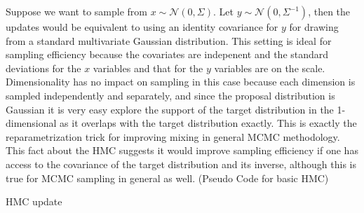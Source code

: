 \documentclass{book}
\begin{document}
\begin{enumerate}
Suppose we want to sample from $x \sim \mathcal{N}(0,\Sigma)$. Let $y \sim
\mathcal{N}(0,\Sigma^{-1})$, then the updates would be equivalent to using an
identity covariance for $y$ for drawing from a standard multivariate Gaussian
distribution. This setting is ideal for sampling efficiency because the
covariates are indepenent and the standard deviations for the $x$ variables and
that for the $y$ variables are on the scale. Dimensionality has no impact on sampling in this case because
each dimension is sampled independently and separately, and since the proposal
distribution is Gaussian it is very easy explore the support of the target
distribution in the 1-dimensional as it overlaps with the target distribution
exactly. 
This is exactly the
reparametrization trick for improving mixing in general MCMC methodology. This
fact about the HMC suggests it would improve sampling efficiency if one has
access to the covariance of the target distribution and its inverse, although this is true for
MCMC sampling in general as well. 
(Pseudo Code for basic HMC)
\begin{algorithm}
    \caption{HMC update}
    \EndFor
    \Else
\end{algorithm}


\end{enumerate}
\end{document}
